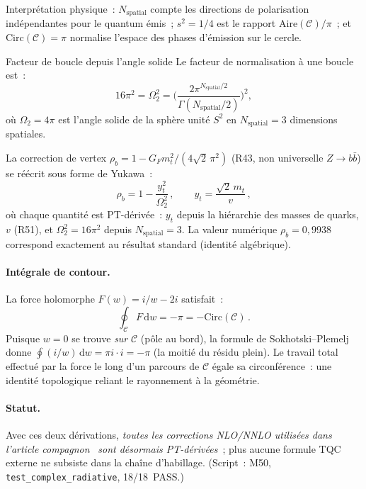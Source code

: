 \documentclass[12pt,a4paper]{article}
\begin{document}
Interprétation physique~: $N_{\mathrm{spatial}}$ compte les directions
de polarisation indépendantes pour le quantum émis~;
$s^2 = 1/4$ est le rapport $\mathrm{Aire}(\mathcal{C})/\pi$~;
et $\mathrm{Circ}(\mathcal{C}) = \pi$ normalise l'espace des phases
d'émission sur le cercle.

\begin{derbox}{Facteur de boucle depuis l'angle solide}
\label{der:loop_factor}
Le facteur de normalisation à une boucle est~:
\begin{equation}
  16\pi^2 = \Omega_2^2 = \biggl(
  \frac{2\pi^{N_{\mathrm{spatial}}/2}}{\Gamma(N_{\mathrm{spatial}}/2)}
  \biggr)^{\!2},
  \label{eq:loop_factor}
\end{equation}
où $\Omega_2 = 4\pi$ est l'angle solide de la sphère unité $S^2$ en
$N_{\mathrm{spatial}} = 3$ dimensions spatiales.
\end{derbox}

La correction de vertex
$\rho_b = 1 - G_F m_t^2/(4\sqrt{2}\,\pi^2)$
(R43, non universelle $Z\to b\bar{b}$) se réécrit sous forme de
Yukawa~:
\begin{equation}
  \rho_b = 1 - \frac{y_t^2}{\Omega_2^2}\,,
  \qquad y_t = \frac{\sqrt{2}\,m_t}{v}\,,
  \label{eq:rho_b_pt}
\end{equation}
où chaque quantité est PT-dérivée~: $y_t$ depuis la hiérarchie des
masses de quarks, $v$ (R51), et $\Omega_2^2 = 16\pi^2$ depuis
$N_{\mathrm{spatial}} = 3$. La valeur numérique $\rho_b = 0{,}9938$
correspond exactement au résultat standard (identité algébrique).

\paragraph{Intégrale de contour.}
La force holomorphe $F(w) = i/w - 2i$ satisfait~:
\begin{equation}
  \oint_{\mathcal{C}} F\,\mathrm{d}w = -\pi = -\mathrm{Circ}(\mathcal{C})\,.
  \label{eq:contour_F}
\end{equation}
Puisque $w = 0$ se trouve \emph{sur} $\mathcal{C}$ (pôle au bord), la
formule de Sokhotski--Plemelj donne
$\oint(i/w)\,\mathrm{d}w = \pi i \cdot i = -\pi$ (la moitié du résidu
plein). Le travail total effectué par la force le long d'un parcours
de $\mathcal{C}$ égale sa circonférence~: une identité topologique
reliant le rayonnement à la géométrie.

\paragraph{Statut.}
Avec ces deux dérivations,
\emph{toutes les corrections NLO/NNLO utilisées dans l'article
compagnon}~\cite{companion_physics} \emph{sont désormais
PT-dérivées}~;
plus aucune formule TQC externe ne subsiste dans la chaîne
d'habillage. (Script~: M50,
\texttt{test\_complex\_radiative}, 18/18~PASS.)
\end{document}

